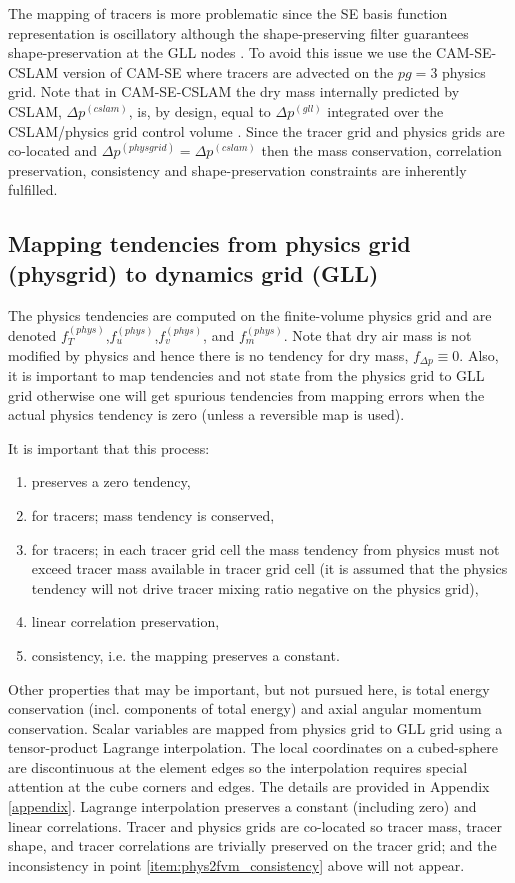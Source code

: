 The mapping of tracers is more problematic since the SE basis function representation is oscillatory although the shape-preserving filter guarantees shape-preservation at the GLL nodes \citep{GTS2014JCP}. To avoid this issue we use the CAM-SE-CSLAM version of CAM-SE where tracers are advected on the $pg=3$ physics grid. Note that in CAM-SE-CSLAM the dry mass internally predicted by CSLAM, $\Delta p^{(cslam)}$, is, by design, equal to $\Delta p^{(gll)}$ integrated over the CSLAM/physics grid control volume \citep{LTOUNGK2017MWR}. Since the tracer grid and physics grids are co-located and $\Delta p^{(physgrid)}=\Delta p^{(cslam)}$ then the  mass conservation, correlation preservation, consistency and shape-preservation constraints are inherently fulfilled.
%
\subsection{Mapping tendencies from physics grid (physgrid) to dynamics grid (GLL)}
The physics tendencies are computed on the finite-volume physics grid and are denoted $f_T^{(phys)}$,$f_u^{(phys)}$,$f_v^{(phys)}$, and $f_m^{(phys)}$. Note that dry air mass is not modified by physics and hence there is no tendency for dry mass,  $f_{\Delta p}\equiv 0$. Also, it is important to map tendencies and not state from the physics grid to GLL grid otherwise one will get spurious tendencies from mapping errors when the actual physics tendency is zero (unless a reversible map is used).

It is important that this process:
\begin{enumerate}
\item preserves a zero tendency,
\item for tracers; mass tendency is conserved,
\item for tracers; in each tracer grid cell the mass tendency from physics must not exceed tracer mass available in tracer grid cell (it is assumed that the physics tendency will not drive tracer mixing ratio negative on the physics grid),\label{item:phys2fvm_consistency}
\item linear correlation preservation,
\item consistency, i.e. the mapping preserves a constant.
\end{enumerate}
Other properties that may be important, but not pursued here, is total energy conservation (incl. components of total energy) and axial angular momentum conservation. Scalar variables are mapped from physics grid to GLL grid using a tensor-product Lagrange interpolation. The local coordinates on a cubed-sphere are discontinuous at the element edges so the interpolation requires special attention at the cube corners and edges. The details are provided in Appendix \ref{appendix}. Lagrange interpolation preserves a constant (including zero) and linear correlations. Tracer and physics grids are co-located so tracer mass, tracer shape, and tracer correlations are trivially preserved on the tracer grid; and the inconsistency in point \ref{item:phys2fvm_consistency} above will not appear. 

